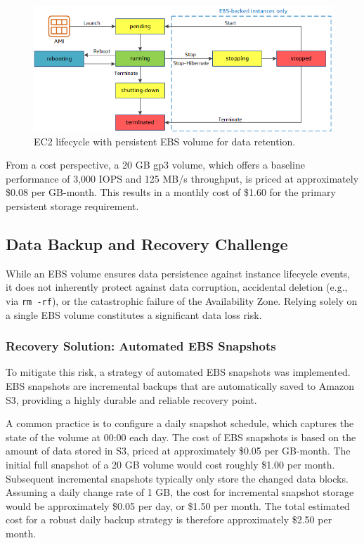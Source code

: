 \begin{center}
\begin{figure}[H]
\includegraphics[scale=0.55]{images/ec2_instance_lifecycle.png}
\caption{EC2 lifecycle with persistent EBS volume for data retention.}
\label{fig:ec2_ebs_persistence}
\end{figure}
\end{center}
From a cost perspective, a 20 GB gp3 volume, which offers a baseline performance of 3,000 IOPS and 125 MB/s throughput, is priced at approximately \$0.08 per GB-month. This results in a monthly cost of \$1.60 for the primary persistent storage requirement.

\subsection{Data Backup and Recovery Challenge}
While an EBS volume ensures data persistence against instance lifecycle events, it does not inherently protect against data corruption, accidental deletion (e.g., via \texttt{rm -rf}), or the catastrophic failure of the Availability Zone. Relying solely on a single EBS volume constitutes a significant data loss risk.

\subsubsection{Recovery Solution: Automated EBS Snapshots}
To mitigate this risk, a strategy of automated EBS snapshots was implemented. EBS snapshots are incremental backups that are automatically saved to Amazon S3, providing a highly durable and reliable recovery point.

A common practice is to configure a daily snapshot schedule, which captures the state of the volume at 00:00 each day. The cost of EBS snapshots is based on the amount of data stored in S3, priced at approximately \$0.05 per GB-month. The initial full snapshot of a 20 GB volume would cost roughly \$1.00 per month. Subsequent incremental snapshots typically only store the changed data blocks. Assuming a daily change rate of 1 GB, the cost for incremental snapshot storage would be approximately \$0.05 per day, or \$1.50 per month. The total estimated cost for a robust daily backup strategy is therefore approximately \$2.50 per month.

